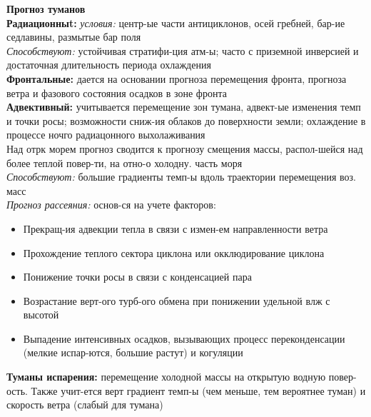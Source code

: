 {\scriptsize \textbf{Прогноз туманов}}\\
\textbf{Радиационныt:} \textit{условия:} центр-ые части антициклонов, осей гребней, бар-ие седлавины, размытые бар поля\\
\textit{Способствуют:} устойчивая стратифи-ция атм-ы; часто с приземной инверсией и достаточная длительность периода охлаждения\\

\textbf{Фронтальные:} дается на основании прогноза перемещения фронта, прогноза ветра и фазового состояния осадков в зоне фронта\\

\textbf{Адвективный:} учитывается перемещение зон тумана, адвект-ые изменения темп и точки росы; возможности сниж-ия облаков до поверхности земли; охлаждение в процессе ночго радиацонного выхолаживания\\
Над отрк морем прогноз сводится к прогнозу смещения массы, распол-шейся над более теплой повер-ти, на отно-о холодну. часть моря\\
\textit{Способствуют:} большие градиенты темп-ы вдоль траектории перемещения воз. масс\\
\textit{Прогноз рассеяния:} основ-ся на учете факторов:
\begin{itemize}
	\item Прекращ-ия адвекции тепла в связи с измен-ем направленности ветра
	\item Прохождение теплого сектора циклона или окклюдирование циклона
	\item Понижение точки росы в связи с конденсацией пара
	\item Возрастание верт-ого турб-ого обмена при понижении удельной влж с высотой
	\item Выпадение интенсивных осадков, вызывающих процесс переконденсации (мелкие испар-ются, большие растут) и когуляции
\end{itemize}
\textbf{Туманы испарения:} перемещение холодной массы на открытую водную повер-ость. Также учит-ется верт градиент темп-ы (чем меньше, тем вероятнее туман) и скорость ветра (слабый для тумана)